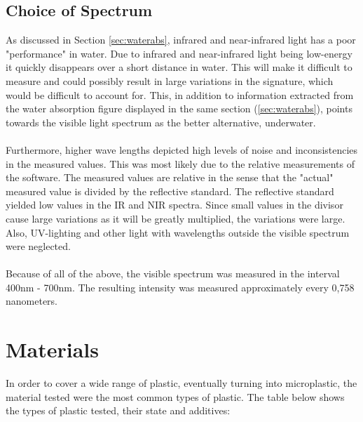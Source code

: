 \subsection{Choice of Spectrum}
As discussed in Section \ref{sec:waterabs}, infrared and near-infrared light has a poor "performance" in water. Due to infrared and near-infrared light being low-energy it quickly disappears over a short distance in water. This will make it difficult to measure and could possibly result in large variations in the signature, which would be difficult to account for. This, in addition to information extracted from the water absorption figure displayed in the same section (\ref{sec:waterabs}), points towards the visible light spectrum as the better alternative, underwater.
\\\\
Furthermore, higher wave lengths depicted high levels of noise and inconsistencies in the measured values. This was most likely due to the relative measurements of the software. The measured values are relative in the sense that the "actual" measured value is divided by the reflective standard. The reflective standard yielded low values in the IR and NIR spectra. Since small values in the divisor cause large variations as it will be greatly multiplied, the variations were large. Also, UV-lighting and other light with wavelengths outside the visible spectrum were neglected.
\\\\
Because of all of the above, the visible spectrum was measured in the interval 400nm - 700nm. The resulting intensity was measured approximately every 0,758 nanometers. 

\section{Materials}
In order to cover a wide range of plastic, eventually turning into microplastic, the material tested were the most common types of plastic. The table below shows the types of plastic tested, their state and additives:

